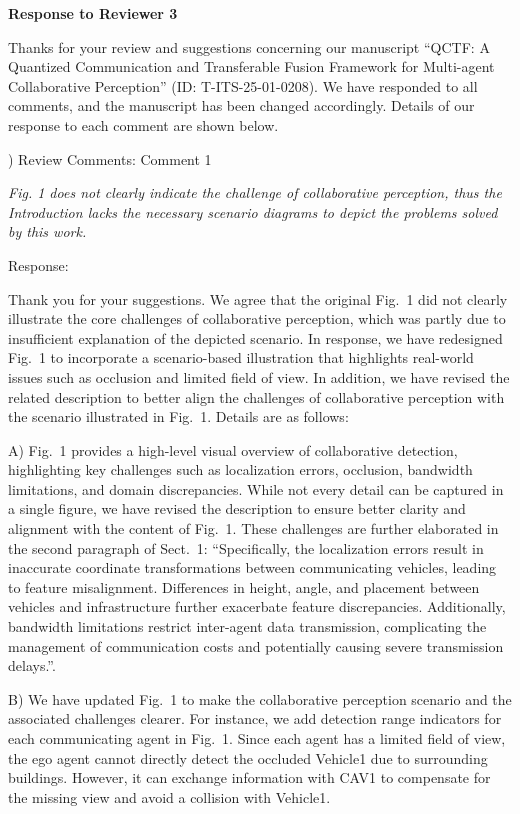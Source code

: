 \documentclass[12pt,a4paper]{article}
\begin{document}
\clearpage
\noindent \textbf{ Response to Reviewer 3}

Thanks for your review and suggestions concerning our manuscript ``QCTF: A Quantized Communication and Transferable Fusion Framework for Multi-agent Collaborative Perception'' (ID: T-ITS-25-01-0208). We have responded to all comments, and the manuscript has been changed accordingly. Details of our response to each comment are shown below.


\vspace{4ex}
) Review Comments: Comment 1

\textit{Fig. 1 does not clearly indicate the challenge of collaborative perception, thus the Introduction lacks the necessary scenario diagrams to depict the problems solved by this work.}

\noindent Response:

Thank you for your suggestions. We agree that the original Fig.~1 did not clearly illustrate the core challenges of collaborative perception, which was partly due to insufficient explanation of the depicted scenario.
In response, we have redesigned Fig.~1 to incorporate a scenario-based illustration that highlights real-world issues such as occlusion and limited field of view. In addition, we have revised the related description to better align the challenges of collaborative perception with the scenario illustrated in Fig.~1. Details are as follows:

 
A) Fig.~1 provides a high-level visual overview of collaborative detection, highlighting key challenges such as localization errors, occlusion, bandwidth limitations, and domain discrepancies. While not every detail can be captured in a single figure, we have revised the description to ensure better clarity and alignment with the content of Fig.~1. These challenges are further elaborated in the second paragraph of Sect.~1: ``Specifically, the localization errors result in inaccurate coordinate transformations between communicating vehicles, leading to feature misalignment. Differences in height, angle, and placement between vehicles and infrastructure further exacerbate feature discrepancies. Additionally, bandwidth limitations restrict inter-agent data transmission, complicating the management of communication costs and potentially causing severe transmission delays.''.


B) We have updated Fig.~1 to make the collaborative perception scenario and the associated challenges clearer. For instance, we add detection range indicators for each communicating agent in Fig.~1. Since each agent has a limited field of view, the ego agent cannot directly detect the occluded Vehicle1 due to surrounding buildings. However, it can exchange information with CAV1 to compensate for the missing view and avoid a collision with Vehicle1.
\end{document}

